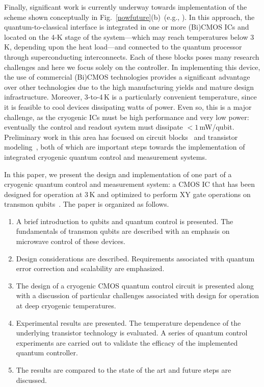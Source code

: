 \documentclass[journal]{IEEEtran}
\newcommand{\CR}[1]{{\color{black}#1}}
\begin{document}
Finally, significant work is currently underway towards implementation of the scheme shown conceptually in Fig.~\ref{nowfuture}(b)~(e.g., \cite{mehrpoo2019benefits,CharbonISSCC}). In this approach, the quantum-to-classical interface is integrated in one or more (Bi)CMOS ICs and located on the 4-K stage of the system\CR{---which may reach temperatures below 3\,K, depending upon the heat load---and connected to the quantum processor through superconducting interconnects. Each of these blocks poses many research challenges and here we focus solely on the controller}.  \CR{In implementing this device, the} use of commercial (Bi)CMOS technologies provides a significant advantage \CR{over other technologies} due to the high manufacturing yields and mature design infrastructure. Moreover, 3-to-4\,K is a particularly convenient temperature, since it is feasible to cool devices dissipating watts of power. Even so, this is a major challenge, as the cryo\CR{genic} ICs must be high performance and very low power\CR{: eventually the control and readout system must dissipate} $<1$\,mW/qubit.  Preliminary work in this area has focused on circuit blocks~\cite{charbonISSCCexpanded,homulle2018deep,sorin} and transistor modeling~\cite{charbonISSCCexpanded,incandela2018characterization,beckers2018characterization}, both of which are important steps towards the implementation of integrated cryogenic quantum control and measurement systems.

 

In this paper, we present the design and implementation of one part of a cryogenic quantum control and measurement system: a CMOS IC that has been designed for operation at \CR{3\,K} and optimized to perform XY gate operations on transmon qubits~\cite{bardinISSCC}.
The paper is organized as follows.
\begin{enumerate}
\item{A brief introduction to qubits and quantum control is presented. The fundamentals of transmon qubits are described with an emphasis on microwave control of these devices.}
\item{Design considerations are described. Requirements associated with quantum error correction and scalability are emphasized.}
\item{The design of a cryogenic CMOS quantum control circuit is presented along with a discussion of particular challenges associated with design for operation at deep cryogenic temperatures.}
\item{Experimental results are presented. The temperature dependence of the underlying transistor technology is evaluated. A series of quantum control experiments are carried out to validate the efficacy of the implemented quantum controller.}
\item{The results are compared to the state of the art and future steps are discussed.}
\end{enumerate}
\end{document}
